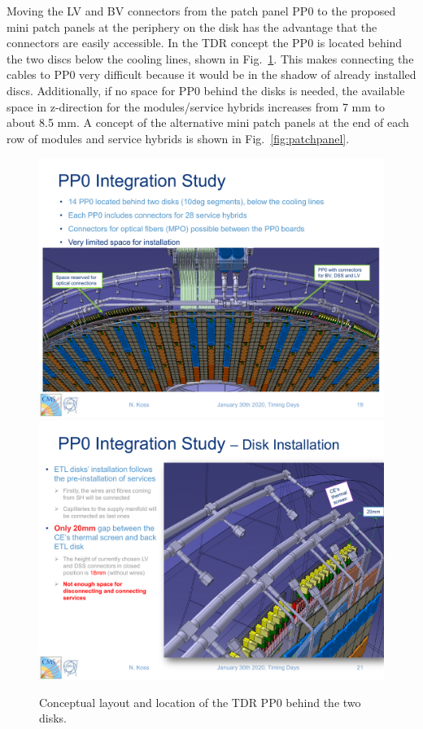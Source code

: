\documentclass[11pt]{article}
\begin{document}
Moving the LV and BV connectors from the patch panel PP0 to the proposed mini patch panels at the periphery on the disk has the advantage that the connectors are easily accessible.
In the TDR concept the PP0 is located behind the two discs below the cooling lines, shown in Fig.~\ref{fig:PP0_3D}.
This makes connecting the cables to PP0 very difficult because it would be in the shadow of already installed discs.
Additionally, if no space for PP0 behind the disks is needed, the available space in z-direction for the modules/service hybrids increases from 7 mm to about 8.5 mm.
A concept of the alternative mini patch panels at the end of each row of modules and service hybrids is shown in Fig.~\ref{fig:patchpanel}.

\begin{figure}[!p]
\centering
\includegraphics[width=1.00 \textwidth]{figures/PP0_3D.pdf}\\
\includegraphics[width=1.00 \textwidth]{figures/PP0_location.pdf}
\caption{
Conceptual layout and location of the TDR PP0 behind the two disks.
}
\label{fig:PP0_3D}
\end{figure}
\end{document}
